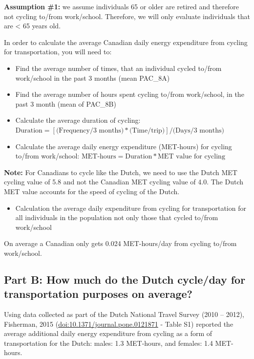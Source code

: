 \documentclass[]{book}
\providecommand{\tightlist}{%
  \setlength{\itemsep}{0pt}\setlength{\parskip}{0pt}}
\begin{document}
\textbf{Assumption \#1:} we assume individuals 65 or older are retired and therefore not cycling to/from work/school. Therefore, we will only evaluate individuals that are \textless{} 65 years old.

In order to calculate the average Canadian daily energy expenditure from cycling for transportation, you will need to:

\begin{itemize}
\item
  Find the average number of times, that an individual cycled to/from work/school in the past 3 months (mean PAC\_8A)
\item
  Find the average number of hours spent cycling to/from work/school, in the past 3 month (mean of PAC\_8B)
\item
  Calculate the average duration of cycling: \(\text{Duration} = [\text{(Frequency/3 months)}*\text{(Time/trip)}] / \text{(Days/3 months)}\)
\item
  Calculate the average daily energy expenditure (MET-hours) for cycling to/from work/school: \(\text{MET-hours} = \text{Duration}*\text{MET value for cycling}\)
\end{itemize}

\textbf{Note:} For Canadians to cycle like the Dutch, we need to use the Dutch MET cycling value of 5.8 and not the Canadian MET cycling value of 4.0. The Dutch MET value accounts for the speed of cycling of the Dutch.

\begin{itemize}
\tightlist
\item
  Calculation the average daily expenditure from cycling for transportation for all individuals in the population not only those that cycled to/from work/school
\end{itemize}

On average a Canadian only gets 0.024 MET-hours/day from cycling to/from work/school.

\hypertarget{part-b-how-much-do-the-dutch-cycleday-for-transportation-purposes-on-average}{%
\subsection{Part B: How much do the Dutch cycle/day for transportation purposes on average?}\label{part-b-how-much-do-the-dutch-cycleday-for-transportation-purposes-on-average}}

Using data collected as part of the Dutch National Travel Survey (2010 -- 2012), Fisherman, 2015 (\url{doi:10.1371/journal.pone.0121871} - Table S1) reported the average additional daily energy expenditure from cycling as a form of transportation for the Dutch: males: 1.3 MET-hours, and females: 1.4 MET-hours.
\end{document}
